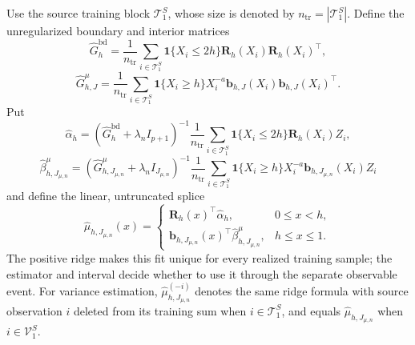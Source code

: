 Use the source training block \(\mathcal T^S_1\), whose size is denoted by \(n_{\mathrm{tr}}=|\mathcal T^S_1|\).  Define the unregularized boundary and interior matrices
\[
 \widehat G^{\mathrm{bd}}_h=\frac1{n_{\mathrm{tr}}}
 \sum_{i\in\mathcal T^S_1}\mathbf 1\{X_i\le2h\}
 \mathbf R_h(X_i)\mathbf R_h(X_i)^\top,
\]
\[
 \widehat G^{\mu}_{h,J}=\frac1{n_{\mathrm{tr}}}
 \sum_{i\in\mathcal T^S_1}\mathbf 1\{X_i\ge h\}X_i^{-a}
 \mathbf b_{h,J}(X_i)\mathbf b_{h,J}(X_i)^\top.
\]
Put
\[
 \widehat\alpha_h=(\widehat G^{\mathrm{bd}}_h+\lambda_nI_{p+1})^{-1}
 \frac1{n_{\mathrm{tr}}}\sum_{i\in\mathcal T^S_1}
 \mathbf 1\{X_i\le2h\}\mathbf R_h(X_i)Z_i,
\]
\[
 \widehat\beta^{\mu}_{h,J_{\mu,n}}=
 (\widehat G^{\mu}_{h,J_{\mu,n}}+\lambda_nI_{J_{\mu,n}})^{-1}
 \frac1{n_{\mathrm{tr}}}\sum_{i\in\mathcal T^S_1}
 \mathbf 1\{X_i\ge h\}X_i^{-a}\mathbf b_{h,J_{\mu,n}}(X_i)Z_i
\]
and define the linear, untruncated splice
\[
 \widehat\mu_{h,J_{\mu,n}}(x)=
 \begin{cases}
 \mathbf R_h(x)^\top\widehat\alpha_h,&0\le x<h,\\
 \mathbf b_{h,J_{\mu,n}}(x)^\top\widehat\beta^{\mu}_{h,J_{\mu,n}},&h\le x\le1.
 \end{cases}
\]
The positive ridge makes this fit unique for every realized training sample; the estimator and interval decide whether to use it through the separate observable event.  For variance estimation, \(\widehat\mu^{(-i)}_{h,J_{\mu,n}}\) denotes the same ridge formula with source observation \(i\) deleted from its training sum when \(i\in\mathcal T^S_1\), and equals \(\widehat\mu_{h,J_{\mu,n}}\) when \(i\in\mathcal V^S_1\).